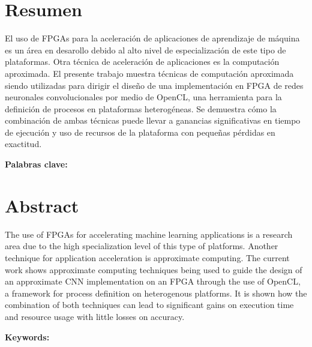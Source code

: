 \chapter*{Resumen}
\thispagestyle{empty}

El uso de FPGAs para la aceleraci\'on de aplicaciones
de aprendizaje de m\'aquina es un área en desarollo
debido al alto nivel de especialización de este tipo de
plataformas. Otra técnica de aceleración de aplicaciones
es la computación aproximada. El presente trabajo muestra
técnicas de computación aproximada siendo utilizadas para
dirigir el diseño de una implementación en FPGA de redes
neuronales convolucionales por medio de OpenCL, una
herramienta para la definición de procesos en plataformas
heterogéneas. Se demuestra cómo la combinación
de ambas técnicas puede llevar a ganancias significativas
en tiempo de ejecución y uso de recursos de la plataforma
con pequeñas pérdidas en exactitud.

\bigskip

\textbf{Palabras clave:} \thesisKeywordsES

\clearpage
\chapter*{Abstract}
\thispagestyle{empty}

The use of FPGAs for accelerating machine learning applications
is a research area due to the high specialization level of
this type of platforms. Another technique for application
acceleration is approximate computing. The current work shows
approximate computing techniques being used to guide the
design of an approximate CNN implementation on an FPGA
through the use of OpenCL, a framework for process definition
on heterogenous platforms. It is shown how the combination
of both techniques can lead to significant gains on execution
time and resource usage with little losses on accuracy.

\bigskip

\textbf{Keywords:} \thesisKeywordsEN

\cleardoublepage

